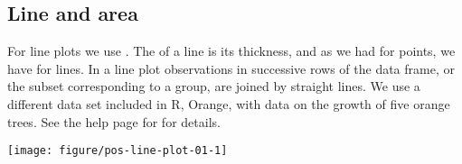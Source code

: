 \documentclass[krantz2]{krantz}\usepackage{knitr}%
\begin{document}
\subsection{Line and area}\label{sec:plot:line}

For line plots we use . The  of a line is its thickness, and as we had  for points, we have  for lines. In a line plot observations in successive rows of the data frame, or the subset corresponding to a group, are joined by straight lines. We use a different data set included in R, Orange, with data on the growth of five orange trees. See the help page for  for details.

\begin{knitrout}\footnotesize
{}\color{fgcolor}\begin{kframe}
\begin{alltt}
\hlstd{(} 
       \hlstd{(}      \hlopt{+}
  \hlstd{()}
\end{alltt}
\end{kframe}

{\centering \texttt{[image: figure/pos-line-plot-01-1]} 

}



\end{knitrout}

\begin{knitrout}\footnotesize
{}\color{fgcolor}\begin{kframe}
\begin{alltt}
\hlstd{(} 
       \hlstd{(}      \hlopt{+}
  \hlstd{()}
\end{alltt}
\end{kframe}
\end{knitrout}
\end{document}
